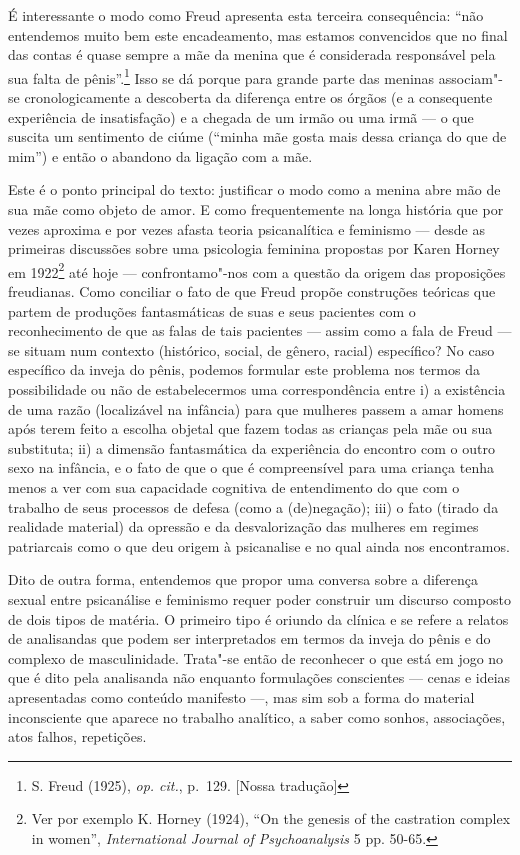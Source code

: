 É interessante o modo como Freud apresenta esta terceira consequência:
``não entendemos muito bem este encadeamento, mas estamos convencidos
que no final das contas é quase sempre a mãe da menina que é considerada
responsável pela sua falta de pênis''.\footnote{S. Freud (1925),
  \emph{op. cit.}, p.~129. {[}Nossa tradução{]}} Isso se dá porque para
grande parte das meninas associam"-se cronologicamente a descoberta da
diferença entre os órgãos (e a consequente experiência de insatisfação)
e a chegada de um irmão ou uma irmã --- o que suscita um sentimento de
ciúme (``minha mãe gosta mais dessa criança do que de mim'') e então o
abandono da ligação com a mãe.

Este é o ponto principal do texto: justificar o modo como a menina abre
mão de sua mãe como objeto de amor. E como frequentemente na longa
história que por vezes aproxima e por vezes afasta teoria psicanalítica
e feminismo --- desde as primeiras discussões sobre uma psicologia
feminina propostas por Karen Horney em 1922\footnote{Ver por exemplo K.
  Horney (1924), ``On the genesis of the castration complex in women'',
  \emph{International Journal of Psychoanalysis} 5 pp. 50-65.} até hoje
--- confrontamo"-nos com a questão da origem das proposições freudianas.
Como conciliar o fato de que Freud propõe construções teóricas que
partem de produções fantasmáticas de suas e seus pacientes com o
reconhecimento de que as falas de tais pacientes --- assim como a fala de
Freud --- se situam num contexto (histórico, social, de gênero, racial)
específico? No caso específico da inveja do pênis, podemos formular
este problema nos termos da possibilidade ou não de estabelecermos uma
correspondência entre i) a existência de uma razão (localizável na
infância) para que mulheres passem a amar homens após terem feito a
escolha objetal que fazem todas as crianças pela mãe ou sua substituta;
ii) a dimensão fantasmática da experiência do encontro com o outro sexo
na infância, e o fato de que o que é compreensível para uma criança
tenha menos a ver com sua capacidade cognitiva de entendimento do que
com o trabalho de seus processos de defesa (como a (de)negação); iii) o
fato (tirado da realidade material) da opressão e da desvalorização das
mulheres em regimes patriarcais como o que deu origem à psicanalise e no
qual ainda nos encontramos.

Dito de outra forma, entendemos que propor uma conversa sobre a
diferença sexual entre psicanálise e feminismo requer poder construir um
discurso composto de dois tipos de matéria. O primeiro tipo é oriundo da
clínica e se refere a relatos de analisandas que podem ser interpretados
em termos da inveja do pênis e do complexo de masculinidade. Trata"-se
então de reconhecer o que está em jogo no que é dito pela analisanda não
enquanto formulações conscientes --- cenas e ideias apresentadas como
conteúdo manifesto ---, mas sim sob a forma do material inconsciente que
aparece no trabalho analítico, a saber como sonhos, associações, atos
falhos, repetições.

